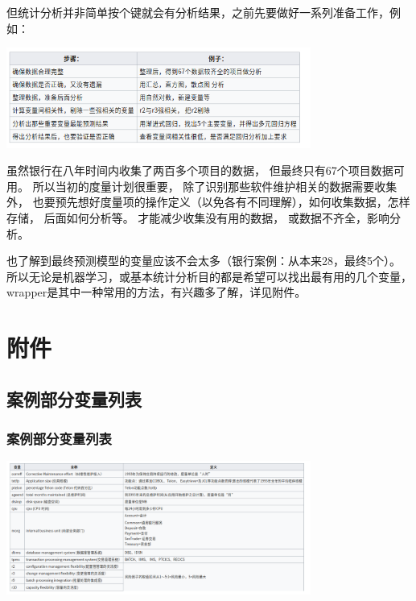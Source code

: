 但统计分析并非简单按个键就会有分析结果，之前先要做好一系列准备工作，例如：


\includegraphics[width=10cm]{Screenshotfrom2023-01-0420-19-06.png}

虽然银行在八年时间内收集了两百多个项目的数据，
但最终只有67个项目数据可用。 所以当初的度量计划很重要，
除了识别那些软件维护相关的数据需要收集外，
也要预先想好度量项的操作定义（以免各有不同理解），如何收集数据，怎样存储，
后面如何分析等。 才能减少收集没有用的数据， 或数据不齐全，影响分析。

也了解到最终预测模型的变量应该不会太多（银行案例：从本来28，最终5个）。
所以无论是机器学习，或基本统计分析目的都是希望可以找出最有用的几个变量，wrapper是其中一种常用的方法，有兴趣多了解，详见附件。

\hypertarget{ux9644ux4ef6}{%
\section{附件}\label{ux9644ux4ef6}}

\hypertarget{ux6848ux4f8bux90e8ux5206ux53d8ux91cfux5217ux8868}{%
\subsection{案例部分变量列表}\label{ux6848ux4f8bux90e8ux5206ux53d8ux91cfux5217ux8868}}

\hypertarget{ux6848ux4f8bux90e8ux5206ux53d8ux91cfux8be6ux79f0ux4e0eux5b9aux4e49}{%
\subsubsection{案例部分变量列表}\label{ux6848ux4f8bux90e8ux5206ux53d8ux91cfux8be6ux79f0ux4e0eux5b9aux4e49}}


\includegraphics[width=10cm]{Screenshotfrom2023-01-0420-19-59.png}

